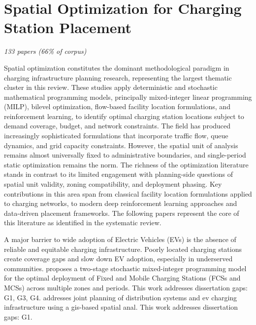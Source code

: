 \documentclass[letterpaper, 12pt, oneside, doublespacing]{Thesis}
\begin{document}
\section{Spatial Optimization for Charging Station Placement}

\textit{133 papers (66\% of corpus)}

Spatial optimization constitutes the dominant methodological paradigm in charging infrastructure planning research, representing the largest thematic cluster in this review. These studies apply deterministic and stochastic mathematical programming models, principally mixed-integer linear programming (MILP), bilevel optimization, flow-based facility location formulations, and reinforcement learning, to identify optimal charging station locations subject to demand coverage, budget, and network constraints. The field has produced increasingly sophisticated formulations that incorporate traffic flow, queue dynamics, and grid capacity constraints. However, the spatial unit of analysis remains almost universally fixed to administrative boundaries, and single-period static optimization remains the norm. The richness of the optimization literature stands in contrast to its limited engagement with planning-side questions of spatial unit validity, zoning compatibility, and deployment phasing. Key contributions in this area span from classical facility location formulations applied to charging networks, to modern deep reinforcement learning approaches and data-driven placement frameworks. The following papers represent the core of this literature as identified in the systematic review.


\noindent A major barrier to wide adoption of Electric Vehicles (EVs) is the absence of reliable and equitable charging infrastructure. Poorly located charging stations create coverage gaps and slow down EV adoption, especially in underserved communities. \cite{a_two-stage_2026} proposes a two-stage stochastic mixed-integer programming model for the optimal deployment of Fixed and Mobile Charging Stations (FCSs and MCSs) across multiple zones and periods. This work addresses dissertation gaps: G1, G3, G4. \cite{joint_planning_2026} addresses joint planning of distribution systems and ev charging infrastructure using a gis-based spatial anal. This work addresses dissertation gaps: G1.
\end{document}

